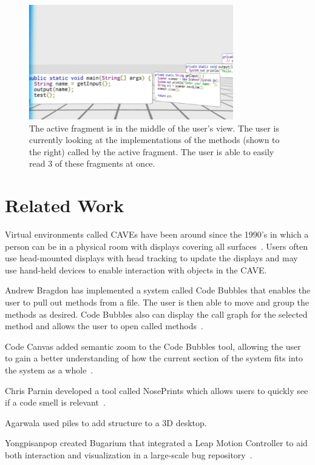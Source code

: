 \documentclass{acm_proc_article-sp}
\begin{document}
\begin{figure}[ht]
\centering
\includegraphics[width=\textwidth,height=5cm]{figures/unwarpped_stack}
\caption{The active fragment is in the middle of the user's view. The user is currently looking at the implementations of the methods (shown to the right) called by the active fragment. The user is able to easily read 3 of these fragments at once.  \label{immersion}}
\end{figure}

\section{Related Work}
Virtual environments called CAVEs have been around since the 1990's in which a person can be in a physical room with displays covering all surfaces~\cite{Cruz-Neira:CAVE}.  Users often use head-mounted displays with head tracking to update the displays and may use hand-held devices to enable interaction with objects in the CAVE.

Andrew Bragdon has implemented a system called Code Bubbles that enables the user to pull out methods from a file. The user is then able to move and group the methods as desired.  Code Bubbles also can display the call graph for the selected method and allows the user to open called methods~\cite{Bragdon:CodeBubbles}.

Code Canvas added semantic zoom to the Code Bubbles tool, allowing the user to gain a better understanding of how the current section of the system fits into the system as a whole~\cite{DeLine:CodeCanvas}.

Chris Parnin developed a tool called NosePrints which allows users to quickly see if a code smell is relevant~\cite{parnin:Noseprints}.

Agarwala used piles to add structure to a 3D desktop.~\cite{Agarawala:BumpTop}

Yongpisanpop created Bugarium that integrated a Leap Motion Controller to aid both interaction and visualization in a large-scale bug repository~\cite{Bugarium}.
\end{document}
